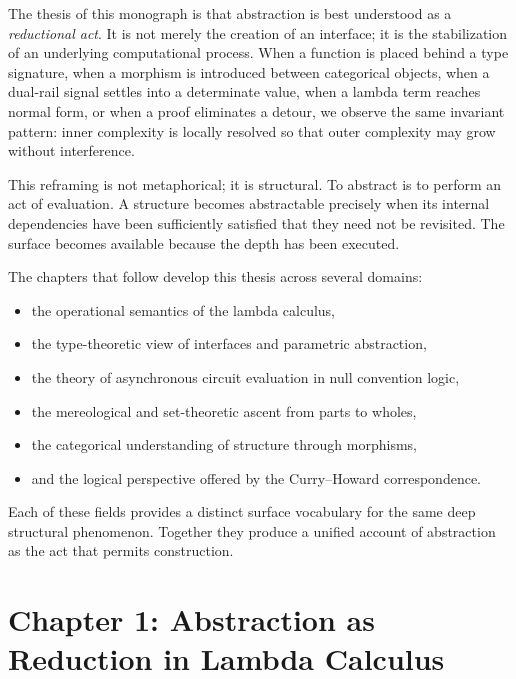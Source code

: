 \documentclass[12pt,letterpaper]{article}
\begin{document}
The thesis of this monograph is that abstraction is best understood as a \emph{reductional act}. It is not merely the creation of an interface; it is the stabilization of an underlying computational process. When a function is placed behind a type signature, when a morphism is introduced between categorical objects, when a dual-rail signal settles into a determinate value, when a lambda term reaches normal form, or when a proof eliminates a detour, we observe the same invariant pattern: inner complexity is locally resolved so that outer complexity may grow without interference.

This reframing is not metaphorical; it is structural. To abstract is to perform an act of evaluation. A structure becomes abstractable precisely when its internal dependencies have been sufficiently satisfied that they need not be revisited. The surface becomes available because the depth has been executed.

The chapters that follow develop this thesis across several domains:

\begin{itemize}[itemsep=0.5em]
    \item the operational semantics of the lambda calculus,
    \item the type-theoretic view of interfaces and parametric abstraction,
    \item the theory of asynchronous circuit evaluation in null convention logic,
    \item the mereological and set-theoretic ascent from parts to wholes,
    \item the categorical understanding of structure through morphisms,
    \item and the logical perspective offered by the Curry--Howard correspondence.
\end{itemize}

Each of these fields provides a distinct surface vocabulary for the same deep structural phenomenon. Together they produce a unified account of abstraction as the act that permits construction.

\newpage

\section{Chapter 1: Abstraction as Reduction in Lambda Calculus}
\end{document}
